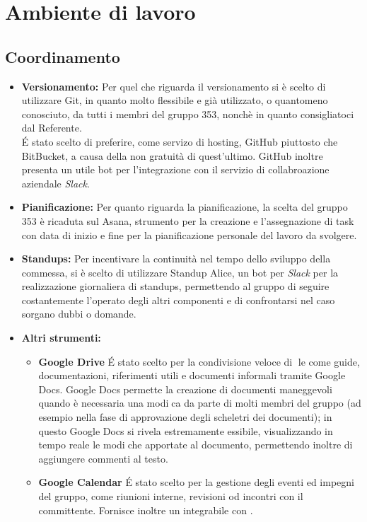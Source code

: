 \documentclass[NormeDiProgetto.tex]{subfiles}
\begin{document}
	\section{Ambiente di lavoro}
	\subsection{Coordinamento}
	\begin{itemize}
		\item \textbf{Versionamento:} Per quel che riguarda il versionamento si è scelto di utilizzare Git, in quanto molto flessibile e già utilizzato, o quantomeno conosciuto, da tutti i membri del gruppo 353, nonchè in quanto consigliatoci dal Referente.\\
		\'{E} stato scelto di preferire, come servizo di hosting, GitHub piuttosto che BitBucket, a causa della non gratuità di quest'ultimo. GitHub inoltre presenta un utile bot per l'integrazione con il servizio di collabroazione aziendale \emph{Slack}.
		\item \textbf{Pianificazione:} Per quanto riguarda la pianificazione, la scelta del gruppo 353 è ricaduta sul Asana, strumento per la creazione e l'assegnazione di task con data di inizio e fine per la pianificazione personale del lavoro da svolgere.
		\item \textbf{Standups:} Per incentivare la continuità nel tempo dello sviluppo della commessa, si è scelto di utilizzare Standup Alice, un bot per \emph{Slack} per la realizzazione giornaliera di standups, permettendo al gruppo di seguire costantemente l'operato degli altri componenti e di confrontarsi nel caso sorgano dubbi o domande.
		\item \textbf{Altri strumenti:} 
		\begin{itemize}
			\item \textbf{Google Drive} \'{E} stato scelto per la condivisione veloce di le come
			guide, documentazioni, riferimenti utili e documenti informali tramite
			Google Docs. Google Docs permette la creazione di documenti
			maneggevoli quando è necessaria una modica da parte di molti membri
			del gruppo (ad esempio nella fase di approvazione degli scheletri dei
			documenti); in questo Google Docs si rivela estremamente 
			essibile,
			visualizzando in tempo reale le modiche apportate al documento,
			permettendo inoltre di aggiungere commenti al testo.
			\item \textbf{Google Calendar} \'{E} stato scelto per la gestione degli eventi ed
			impegni del gruppo, come riunioni interne, revisioni od incontri con il committente. Fornisce
			inoltre un  integrabile con .
		\end{itemize}
	\end{itemize}
\end{document}
